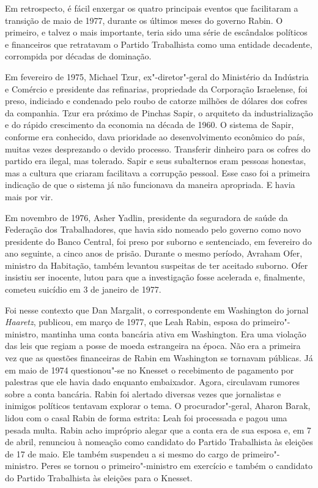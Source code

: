 Em retrospecto, é fácil enxergar os quatro principais eventos que
facilitaram a transição de maio de 1977, durante os últimos meses do
governo Rabin. O primeiro, e talvez o mais importante, teria sido uma
série de escândalos políticos e financeiros que retratavam o Partido
Trabalhista como uma entidade decadente, corrompida por décadas de
dominação.

Em fevereiro de 1975, Michael Tzur, ex"-diretor"-geral do Ministério da
Indústria e Comércio e presidente das refinarias, propriedade da
Corporação Israelense, foi preso, indiciado e condenado pelo roubo de
catorze milhões de dólares dos cofres da companhia. Tzur era próximo de
Pinchas Sapir, o arquiteto da industrialização e do rápido crescimento
da economia na década de 1960. O sistema de Sapir, conforme era
conhecido, dava prioridade ao desenvolvimento econômico do país, muitas
vezes desprezando o devido processo. Transferir dinheiro para os cofres
do partido era ilegal, mas tolerado. Sapir e seus subalternos eram
pessoas honestas, mas a cultura que criaram facilitava a corrupção
pessoal. Esse caso foi a primeira indicação de que o sistema já não
funcionava da maneira apropriada. E havia mais por vir.

Em novembro de 1976, Asher Yadlin, presidente da seguradora de saúde da
Federação dos Trabalhadores, que havia sido nomeado pelo governo como
novo presidente do Banco Central, foi preso por suborno e sentenciado,
em fevereiro do ano seguinte, a cinco anos de prisão. Durante o
mesmo período, Avraham Ofer, ministro da Habitação, também levantou
suspeitas de ter aceitado suborno. Ofer insistiu ser inocente, lutou
para que a investigação fosse acelerada e, finalmente, cometeu suicídio
em 3 de janeiro de 1977.

Foi nesse contexto que Dan Margalit, o correspondente em Washington do
jornal \textit{Haaretz}, publicou, em março de 1977, que
Leah Rabin, esposa do primeiro"-ministro, mantinha uma conta bancária
ativa em Washington. Era uma violação das leis que regiam a posse de
moeda estrangeira na época. Não era a primeira vez que as questões
financeiras de Rabin em Washington se tornavam públicas. Já em maio de
1974 questionou"-se no Knesset o recebimento de pagamento por palestras
que ele havia dado enquanto embaixador. Agora, circulavam rumores sobre
a conta bancária. Rabin foi alertado diversas vezes que jornalistas e
inimigos políticos tentavam explorar o tema. O procurador"-geral, Aharon
Barak, lidou com o casal Rabin de forma estrita: Leah foi processada e
pagou uma pesada multa. Rabin acho impróprio alegar que a conta era de
sua esposa e, em 7 de abril, renunciou à nomeação como candidato do
Partido Trabalhista às eleições de 17 de maio. Ele também 
suspendeu a si mesmo do cargo de primeiro"-ministro. Peres se tornou o
primeiro"-ministro em exercício e também o candidato do Partido Trabalhista às eleições
para o Knesset.

